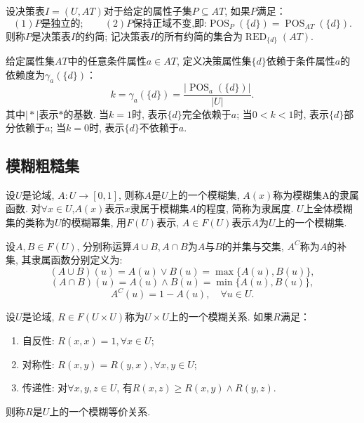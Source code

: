\begin{Definition}[约简决策表]\cite{翟俊海2014}
    设决策表$I=(U,AT)$对于给定的属性子集$P \subseteq AT$, 如果$P$满足：
    $$(1)P\text{是独立的}; \qquad(2)P\text{保持正域不变,即:}\operatorname{POS}_{P}(\{d\})=\operatorname{POS}_{AT}(\{d\}).$$
    则称$P$是决策表$I$的约简; 记决策表$I$的所有约简的集合为$\operatorname{RED}_{\{d\}}(AT)$.
\end{Definition}
\begin{Definition}[依赖度]\cite{翟俊海2014}
    给定属性集$AT$中的任意条件属性$a \in AT$, 定义决策属性集$\{d\}$依赖于条件属性$a$的依赖度为$\gamma_a(\{d\})$：
    $$k=\gamma_a(\{d\})=\frac{|\operatorname{POS}_{a}(\{d\})|}{|U|}.$$
    其中$\mid * \mid$表示$*$的基数. 当$k=1$时, 表示$\{d\}$完全依赖于$a$; 当$0 < k < 1$时, 表示$\{d\}$部分依赖于$a$; 当$k=0$时, 表示$\{d\}$不依赖于$a$. 
\end{Definition}
\subsection{模糊粗糙集}
\begin{Definition}[模糊集]\cite{粒计算基础教程}
设$U$是论域, $A:U\rightarrow [0,1]$, 则称$A$是$U$上的一个模糊集, $A(x)$称为模糊集A的隶属函数. 对$\forall x \in U $,$A(x)$表示$x$隶属于模糊集$A$的程度, 简称为隶属度. $U$上全体模糊集的类称为$U$的模糊幂集, 用$F(U)$表示, $A\in F(U)$表示$A$为$U$上的一个模糊集.
\end{Definition}
\begin{Definition}[模糊集的运算]\cite{粒计算基础教程}
  设$A,B\in F(U)$, 分别称运算$A\cup B,A\cap B$为$A$与$B$的并集与交集, $A^C$称为$A$的补集, 其隶属函数分别定义为:
    $$(A \cup B)(u)=A(u) \vee B(u)=\max \{A(u), B(u)\},$$
    $$(A \cap B)(u)=A(u) \wedge B(u)=\min \{A(u), B(u)\},$$
    $$A^{C}(u)=1-A(u), \quad \forall u \in U .$$
  \end{Definition}
\begin{Definition}[模糊等价关系]\cite{粒计算基础教程}
设$U$是论域, $R \in F(U \times U)$称为$U \times U$上的一个模糊关系. 如果$R$满足：
\end{Definition}
\begin{enumerate}
\item 自反性: $R(x,x)=1, \forall x \in U$;
\item 对称性: $R(x,y)=R(y,x),\forall x,y \in U$;
\item 传递性: 对$\forall x,y,z\in U$, 有$R(x,z)\geq R(x,y)\wedge R(y,z)$.
\end{enumerate}
则称$R$是$U$上的一个模糊等价关系.

